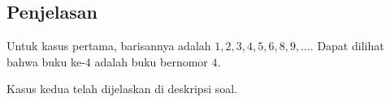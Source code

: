 \documentclass{article}
\begin{document}
\subsection*{Penjelasan}
Untuk kasus pertama, barisannya adalah $1, 2, 3, 4, 5, 6, 8, 9, \dots$. Dapat dilihat bahwa buku ke-$4$ adalah buku bernomor $4$.

Kasus kedua telah dijelaskan di deskripsi soal.

\pagebreak
\end{document}
